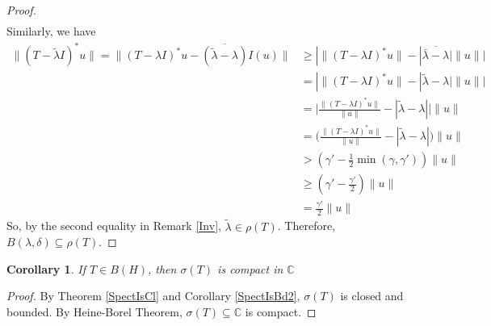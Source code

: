 \documentclass{report}
\newtheorem{cor}{Corollary}
\begin{document}
\begin{proof}
$$\begin{aligned}
  \end{aligned}
  $$
  Similarly, we have
  $$
  \begin{aligned}
    \lVert(T-\tilde{\lambda}I)^{*}u\rVert=\lVert(T-\lambda I)^{*}u-\overline{(\tilde{\lambda}-\lambda)}I(u)\rVert&\geq|\lVert(T-\lambda I)^{*}u\rVert-|\overline{\bar{\lambda}-\lambda}|\lVert u\rVert| \\
                                                                                                                 &=|\lVert(T-\lambda I)^{*}u\rVert-|\tilde{\lambda}-\lambda|\lVert u\rVert| \\
                                                                                                                 &=\Big|\frac{\lVert(T-\lambda I)^{*}u\rVert}{\lVert u\rVert}-|\tilde{\lambda}-\lambda|\Big|\lVert u\rVert \\
                                                                                                                 &=\Big(\frac{\lVert(T-\lambda I)^{*}u\rVert}{\lVert u\rVert}-|\tilde{\lambda}-\lambda|\Big)\lVert u\rVert \\
                                                                                                                 &>(\gamma'-\frac{1}{2}\min(\gamma,\gamma'))\lVert u\rVert \\
                                                                                                                 &\geq(\gamma'-\frac{\gamma'}{2})\lVert u\rVert \\
                                                                                                                 &=\frac{\gamma'}{2}\lVert u\rVert
  \end{aligned}
  $$
  So, by the second equality in Remark \ref{Inv}, $\tilde{\lambda}\in\rho(T)$. Therefore, $B(\lambda,\delta)\subseteq\rho(T)$.
\end{proof}

\begin{cor}
  If $T\in B(H)$, then $\sigma(T)$ is compact in $\mathbb{C}$
\end{cor}
\begin{proof}
  By Theorem \ref{SpectIsCl} and Corollary \ref{SpectIsBd2}, $\sigma(T)$ is closed and bounded. By Heine-Borel Theorem, $\sigma(T)\subseteq\mathbb{C}$ is compact.
\end{proof}
\end{document}
